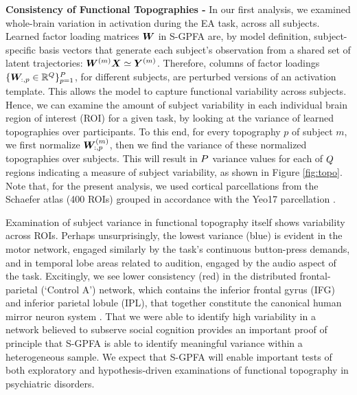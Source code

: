 \textbf{Consistency of Functional Topographies - }
In our first analysis, we examined whole-brain variation in activation during the EA task, across all subjects. Learned factor loading matrices $\bm{W}$ in S-GPFA are, by model definition, subject-specific basis vectors that generate each subject's observation from a shared set of latent trajectories: $\bm{W}^{(m)}\bm{X} \simeq \bm{Y}^{(m)}$. Therefore, columns of factor loadings $\{\bm{W}_{:,p} \in \mathbb{R}^Q\}_{p=1}^{P}$, for different subjects, are perturbed versions of an activation template. This allows the model to capture functional variability across subjects. Hence, we can examine the amount of subject variability in each individual brain region of interest (ROI) for a given task, by looking at the variance of learned topographies over participants. To this end, for every topography $p$ of subject $m$, we first normalize $\bm{W}^{(m)}_{:,p}$, then we find the variance of these normalized topographies over subjects. This will result in $P$ variance values for each of $Q$ regions indicating a measure of subject variability, as shown in Figure  \ref{fig:topo}. Note that, for the present analysis, we used cortical parcellations from the Schaefer atlas (400 ROIs) \cite{schaefer2018local} grouped in accordance with the Yeo17 parcellation \cite{yeo}. 

Examination of subject variance in functional topography itself shows variability across ROIs. Perhaps unsurprisingly, the lowest variance (blue) is evident in the motor network, engaged similarly by the task’s continuous button-press demands, and in temporal lobe areas related to audition, engaged by the audio aspect of the task. Excitingly, we see lower consistency (red) in the distributed frontal-parietal (‘Control A’) network, which contains the inferior frontal gyrus (IFG) and inferior parietal lobule (IPL), that together constitute the canonical human mirror neuron system \cite{iacoboni2006mirror}. That we were able to identify high variability in a network believed to subserve social cognition provides an important proof of principle that S-GPFA is able to identify meaningful variance within a heterogeneous sample. We expect that S-GPFA will enable important tests of both exploratory and hypothesis-driven examinations of functional topography in psychiatric disorders.

